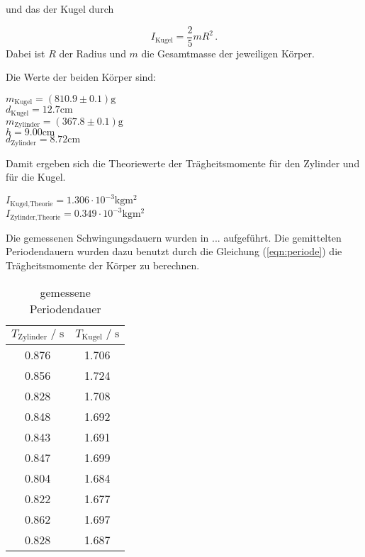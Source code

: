 und das der Kugel durch

\begin{equation}
  I_{\text{Kugel}} = \frac{2}{5} mR^2 \, .
\end{equation}
Dabei ist $R$ der Radius und $m$ die Gesamtmasse der jeweiligen Körper.

Die Werte der beiden Körper sind:
\begin{center}
  $m_{\text{Kugel}} = (810.9 \pm 0.1)\si{\gram}$ \\
  $d_{\text{Kugel}} = 12.7\si{\centi\meter}$ \\
  $m_{\text{Zylinder}} = (367.8\pm 0.1)\si{\gram}$ \\
  $h = 9.00 \si{\centi\meter}$ \\
  $d_{\text{Zylinder}} = 8.72 \si{\centi\meter}$ \\
\end{center}

Damit ergeben sich die Theoriewerte der Trägheitsmomente für den Zylinder und für die Kugel.

\begin{center}
  $I_{\text{Kugel,Theorie}} = 1.306 \cdot 10^{-3} \si{\kilogram\meter^2}$ \\
  $I_{\text{Zylinder,Theorie}} = 0.349 \cdot 10^{-3} \si{\kilogram\meter^2}$ \\
\end{center}

Die gemessenen Schwingungsdauern wurden in $...$ aufgeführt. Die gemittelten Periodendauern wurden dazu benutzt
durch die Gleichung (\autoref{eqn:periode}) die Trägheitsmomente der Körper zu berechnen.

\begin{table}
  \centering
   \caption{gemessene Periodendauer}
   \label{tab:traegheitsmomente}
   \begin{tabular}{c c}
      \toprule
      $ T_{\text{Zylinder}} \;/\; \si{\second}$ & $ T_{\text{Kugel}} \;/\; \si{\second}$ \\
      \midrule
      0.876 & 1.706 \\
      0.856 & 1.724 \\
      0.828 & 1.708 \\
      0.848 & 1.692 \\
      0.843 & 1.691 \\
      0.847 & 1.699 \\
      0.804 & 1.684 \\
      0.822 & 1.677 \\
      0.862 & 1.697 \\
      0.828 & 1.687 \\
      \bottomrule
   \end{tabular}
\end{table}

